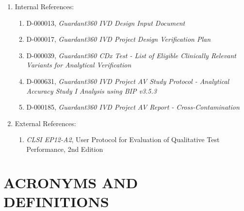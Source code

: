 \documentclass[12pt]{protocol}
\begin{document}
\begin{enumerate}
	\item Internal References:
	\begin{enumerate}
	\item D-000013, \emph{Guardant360 IVD Design Input Document}
	\item D-000017, \emph{Guardant360 IVD Project Design Verification Plan}
	\item D-000039, \emph{Guardant360 CDx Test - List of Eligible Clinically 
		  Relevant Variants for Analytical Verification}
	\item D-000631, \emph{Guardant360 IVD Project AV Study Protocol - 
             Analytical Accuracy Study I Analysis using BIP v3.5.3}
	\item D-000185, \emph{Guardant360 IVD Project AV Report - Cross-Contamination}

	\end{enumerate}
	\item External References:
	\begin{enumerate}
	\item \emph{CLSI EP12-A2}, User Protocol for Evaluation of Qualitative Test Performance, 2nd Edition
	\end{enumerate}
\end{enumerate}

\section{ACRONYMS AND DEFINITIONS}
\end{document}
